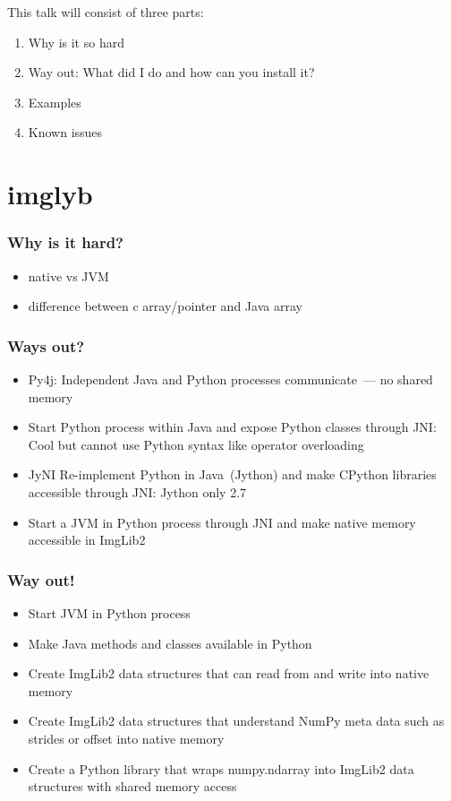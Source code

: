 \documentclass[aspectratio=169]{beamer}
\begin{document}
\begin{frame}
    This talk will consist of three parts:
    \begin{enumerate}
          \item Why is it so hard
          \item Way out: What did I do and how can you install it?
          \item Examples
          \item Known issues
    \end{enumerate}
\end{frame}

\section{imglyb}
\begin{frame}
    \frametitle{Why is it hard?}
    \begin{itemize}
          \item native vs JVM
          \item difference between c array/pointer and Java array
    \end{itemize}
\end{frame}

\begin{frame}
    \frametitle{Ways out?}
    \begin{itemize}
          \item Py4j: Independent Java and Python processes communicate~--- no shared memory
          \item Start Python process within Java and expose Python classes through JNI: Cool but
        cannot use Python syntax like operator overloading
          \item JyNI Re-implement Python in Java~(Jython) and make CPython libraries accessible through JNI:
        Jython only 2.7
          \item Start a JVM in Python process through JNI and make native memory accessible in ImgLib2 
    \end{itemize}
\end{frame}


\begin{frame}
    \frametitle{Way out!}
    \begin{itemize}
          \item Start JVM in Python process
          \item Make Java methods and classes available in Python
          \item Create ImgLib2 data structures that can read from and write into native memory
          \item Create ImgLib2 data structures that understand NumPy meta data such as strides or
        offset into native memory
          \item Create a Python library that wraps numpy.ndarray into ImgLib2 data structures with
        shared memory access
    \end{itemize}
\end{frame}
\end{document}
